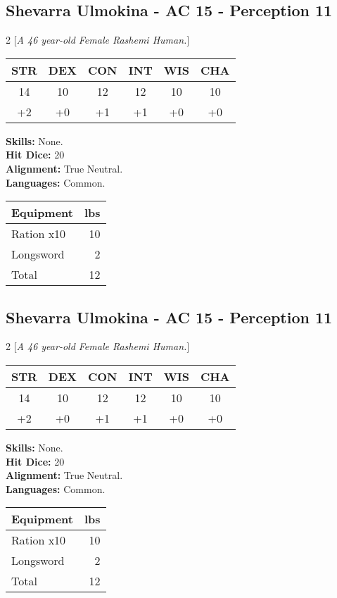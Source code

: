 \begin{minipage}
\subsection*{Shevarra Ulmokina - AC 15 - Perception 11}
\begin{multicols}{2}
[\textit{A 46 year-old Female Rashemi Human.}]
\begin{tabular}{cccccc}
 {STR}&
 {DEX}&
 {CON}&
 {INT}&
 {WIS}&
 {CHA}\\
\hline
14 & 10 & 12 & 12 & 10 & 10\\
+2 & +0 & +1 & +1 & +0 & +0
\end{tabular}
\textbf{Skills:} 
None.\\
\textbf{Hit Dice:} 20\\
\textbf{Alignment:} True Neutral.\\
\textbf{Languages:} 
Common.\\

\begin{tabular}{p{} r}
\textbf{Equipment} & lbs\\
\hline

Ration x10 & 10\\

Longsword & 2\\

\hline
Total & 12
\end{tabular}


\end{multicols}


\end{minipage}

\subsection*{Shevarra Ulmokina - AC 15 - Perception 11}
\begin{multicols}{2}
[\textit{A 46 year-old Female Rashemi Human.}]
\begin{tabular}{cccccc}
 {STR}&
 {DEX}&
 {CON}&
 {INT}&
 {WIS}&
 {CHA}\\
\hline
14 & 10 & 12 & 12 & 10 & 10\\
+2 & +0 & +1 & +1 & +0 & +0
\end{tabular}
\textbf{Skills:} 
None.\\
\textbf{Hit Dice:} 20\\
\textbf{Alignment:} True Neutral.\\
\textbf{Languages:} 
Common.\\

\begin{tabular}{p{} r}
\textbf{Equipment} & lbs\\
\hline

Ration x10 & 10\\

Longsword & 2\\

\hline
Total & 12
\end{tabular}


\end{multicols}


